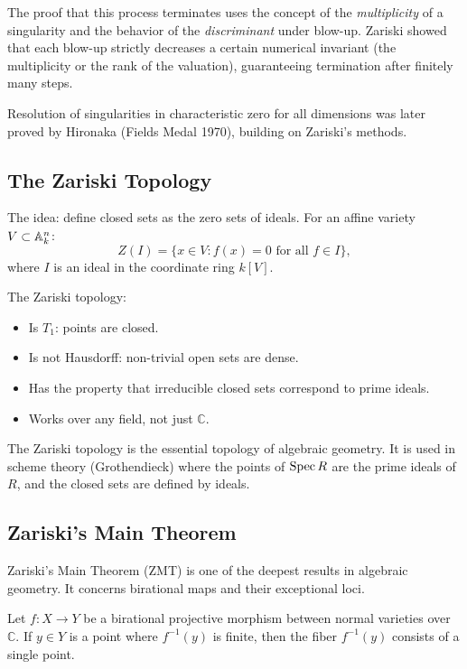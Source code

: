 The proof that this process terminates uses the concept of the \textit{multiplicity} of a singularity and the behavior of the \textit{discriminant} under blow-up. Zariski showed that each blow-up strictly decreases a certain numerical invariant (the multiplicity or the rank of the valuation), guaranteeing termination after finitely many steps.

Resolution of singularities in characteristic zero for all dimensions was later proved by Hironaka (Fields Medal 1970), building on Zariski's methods.

\subsection{The Zariski Topology}

The idea: define closed sets as the zero sets of ideals. For an affine variety $V \subset \mathbb{A}^n_k$:
\[
Z(I) = \{x \in V : f(x) = 0 \text{ for all } f \in I\},
\]
where $I$ is an ideal in the coordinate ring $k[V]$.

The Zariski topology:
\begin{itemize}
    \item Is $T_1$: points are closed.
    \item Is not Hausdorff: non-trivial open sets are dense.
    \item Has the property that irreducible closed sets correspond to prime ideals.
    \item Works over any field, not just $\mathbb{C}$.
\end{itemize}

The Zariski topology is the essential topology of algebraic geometry. It is used in scheme theory (Grothendieck) where the points of $\operatorname{Spec} R$ are the prime ideals of $R$, and the closed sets are defined by ideals.

\subsection{Zariski's Main Theorem}

Zariski's Main Theorem (ZMT) is one of the deepest results in algebraic geometry. It concerns birational maps and their exceptional loci.

\begin{theorem}
Let $f: X \to Y$ be a birational projective morphism between normal varieties over $\mathbb{C}$. If $y \in Y$ is a point where $f^{-1}(y)$ is finite, then the fiber $f^{-1}(y)$ consists of a single point.
\end{theorem}

